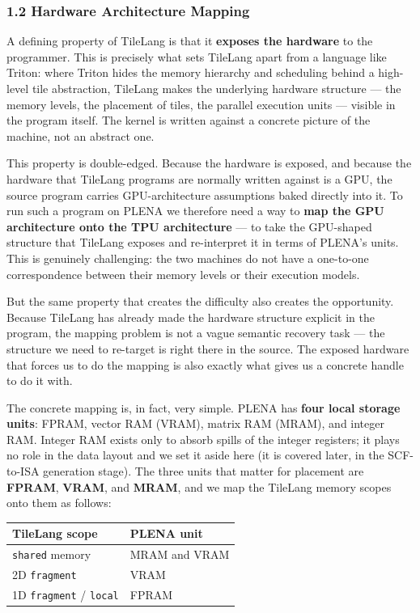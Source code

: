 \documentclass[
  10pt,
]{article}
\begin{document}
\subsubsection{1.2 Hardware Architecture
Mapping}\label{isa-compiler-hardware-architecture-mapping}

A defining property of TileLang is that it \textbf{exposes the hardware}
to the programmer. This is precisely what sets TileLang apart from a
language like Triton: where Triton hides the memory hierarchy and
scheduling behind a high-level tile abstraction, TileLang makes the
underlying hardware structure --- the memory levels, the placement of
tiles, the parallel execution units --- visible in the program itself.
The kernel is written against a concrete picture of the machine, not an
abstract one.

This property is double-edged. Because the hardware is exposed, and
because the hardware that TileLang programs are normally written against
is a GPU, the source program carries GPU-architecture assumptions baked
directly into it. To run such a program on PLENA we therefore need a way
to \textbf{map the GPU architecture onto the TPU architecture} --- to
take the GPU-shaped structure that TileLang exposes and re-interpret it
in terms of PLENA's units. This is genuinely challenging: the two
machines do not have a one-to-one correspondence between their memory
levels or their execution models.

But the same property that creates the difficulty also creates the
opportunity. Because TileLang has already made the hardware structure
explicit in the program, the mapping problem is not a vague semantic
recovery task --- the structure we need to re-target is right there in
the source. The exposed hardware that forces us to do the mapping is
also exactly what gives us a concrete handle to do it with.

The concrete mapping is, in fact, very simple. PLENA has \textbf{four
local storage units}: FPRAM, vector RAM (VRAM), matrix RAM (MRAM), and
integer RAM. Integer RAM exists only to absorb spills of the integer
registers; it plays no role in the data layout and we set it aside here
(it is covered later, in the SCF-to-ISA generation stage). The three
units that matter for placement are \textbf{FPRAM}, \textbf{VRAM}, and
\textbf{MRAM}, and we map the TileLang memory scopes onto them as
follows:

\begin{longtable}[]{@{}ll@{}}
\toprule\noalign{}
TileLang scope & PLENA unit \\
\midrule\noalign{}
\endhead
\bottomrule\noalign{}
\endlastfoot
\texttt{shared} memory & MRAM and VRAM \\
2D \texttt{fragment} & VRAM \\
1D \texttt{fragment} / \texttt{local} & FPRAM \\
\end{longtable}
\end{document}
